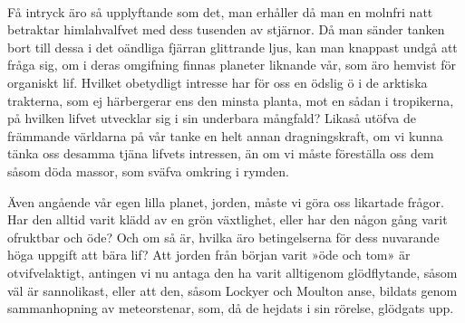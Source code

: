 \documentclass[a4paper, 12pt, oneside, swedish]{article}
\begin{document}
\paragraph{}
Få intryck äro så upplyftande som det, man erhåller då man en molnfri natt betraktar himlahvalfvet med dess tusenden av stjärnor. Då man sänder tanken bort till dessa i det oändliga fjärran glittrande ljus, kan man knappast undgå att fråga sig, om i deras omgifning finnas planeter liknande vår, som äro hemvist för organiskt lif. Hvilket obetydligt intresse har för oss en ödslig ö i de arktiska trakterna, som ej härbergerar ens den minsta planta, mot en sådan i tropikerna, på hvilken lifvet utvecklar sig i sin underbara mångfald? Likaså utöfva de främmande världarna på vår tanke en helt annan dragningskraft, om vi kunna tänka oss desamma tjäna lifvets intressen, än om vi måste föreställa oss dem såsom döda massor, som sväfva omkring i rymden.

Även angående vår egen lilla planet, jorden, måste vi göra oss likartade frågor. Har den alltid varit klädd av en grön växtlighet, eller har den någon gång varit ofruktbar och öde? Och om så är, hvilka äro betingelserna för dess nuvarande höga uppgift att bära lif? Att jorden från början varit »öde och tom» är otvifvelaktigt, antingen vi nu antaga den ha varit alltigenom glödflytande, såsom väl är sannolikast, eller att den, såsom Lockyer och Moulton anse, bildats genom sammanhopning av meteorstenar, som, då de hejdats i sin rörelse, glödgats upp.
\end{document}
